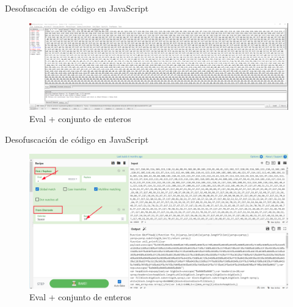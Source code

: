 \documentclass[aspectratio=169]{beamer}
\begin{document}
	
	\begin{frame}{Desofuscación de código en JavaScript}
	\begin{figure}[H]
		\centering
		\includegraphics[width=12cm]{images/pdf1.png}
		\caption{Eval + conjunto de enteros}
	\end{figure}
	
	\end{frame}

	
	\begin{frame}{Desofuscación de código en JavaScript}
		
	\begin{figure}[H]
		\centering
		\includegraphics[width=12cm]{images/pdf2.png}
		\caption{Eval + conjunto de enteros}
	\end{figure}
	
	\end{frame}
    
\end{document}
